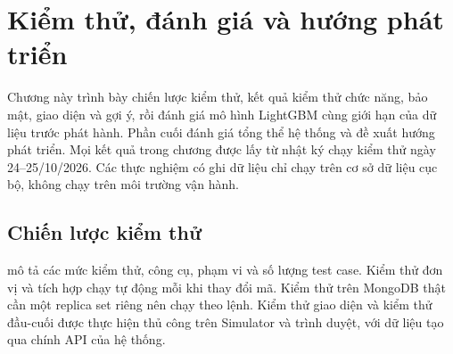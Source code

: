 \chapter{Kiểm thử, đánh giá và hướng phát triển}\label{chap:evaluation}

Chương này trình bày chiến lược kiểm thử, kết quả kiểm thử chức năng, bảo mật, giao diện và gợi ý, rồi đánh giá mô hình LightGBM cùng giới hạn của dữ liệu trước phát hành. Phần cuối đánh giá tổng thể hệ thống và đề xuất hướng phát triển. Mọi kết quả trong chương được lấy từ nhật ký chạy kiểm thử ngày 24--25/10/2026. Các thực nghiệm có ghi dữ liệu chỉ chạy trên cơ sở dữ liệu cục bộ, không chạy trên môi trường vận hành.

\section{Chiến lược kiểm thử}\label{sec:test-strategy}

 mô tả các mức kiểm thử, công cụ, phạm vi và số lượng test case. Kiểm thử đơn vị và tích hợp chạy tự động mỗi khi thay đổi mã. Kiểm thử trên MongoDB thật cần một replica set riêng nên chạy theo lệnh. Kiểm thử giao diện và kiểm thử đầu-cuối được thực hiện thủ công trên Simulator và trình duyệt, với dữ liệu tạo qua chính API của hệ thống.

